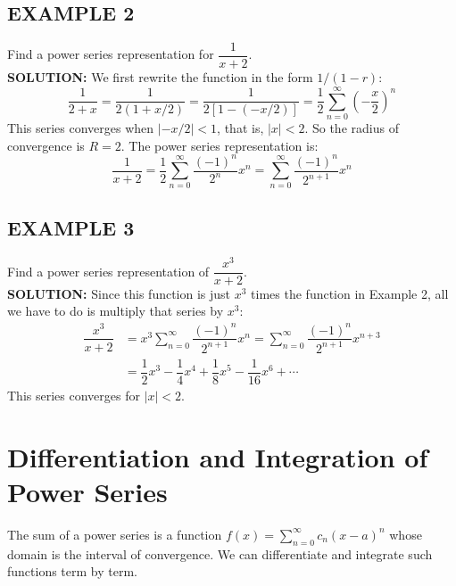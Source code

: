 \documentclass{article}
\theoremstyle{mystyle}
\begin{document}
\subsection*{EXAMPLE 2}
Find a power series representation for \( \dfrac{1}{x+2} \).\\
\textbf{SOLUTION:}
We first rewrite the function in the form \(1/(1-r)\):
\[ \dfrac{1}{2+x} = \dfrac{1}{2(1 + x/2)} = \dfrac{1}{2[1 - (-x/2)]} = \dfrac{1}{2} \sum_{n=0}^{\infty} \left(-\dfrac{x}{2}\right)^n \]
This series converges when \(|-x/2| < 1\), that is, \(|x| < 2\). So the radius of convergence is \(R=2\). The power series representation is:
\[ \dfrac{1}{x+2} = \dfrac{1}{2} \sum_{n=0}^{\infty} \dfrac{(-1)^n}{2^n} x^n = \sum_{n=0}^{\infty} \dfrac{(-1)^n}{2^{n+1}} x^n \]

\subsection*{EXAMPLE 3}
Find a power series representation of \( \dfrac{x^3}{x+2} \).\\
\textbf{SOLUTION:}
Since this function is just \(x^3\) times the function in Example 2, all we have to do is multiply that series by \(x^3\):
\begin{align*}
    \dfrac{x^3}{x+2} &= x^3 \sum_{n=0}^{\infty} \dfrac{(-1)^n}{2^{n+1}} x^n = \sum_{n=0}^{\infty} \dfrac{(-1)^n}{2^{n+1}} x^{n+3} \\
    &= \dfrac{1}{2}x^3 - \dfrac{1}{4}x^4 + \dfrac{1}{8}x^5 - \dfrac{1}{16}x^6 + \cdots
\end{align*}
This series converges for \(|x|<2\).

\section*{Differentiation and Integration of Power Series}
The sum of a power series is a function \(f(x) = \sum_{n=0}^\infty c_n (x-a)^n\) whose domain is the interval of convergence. We can differentiate and integrate such functions term by term.
\end{document}
